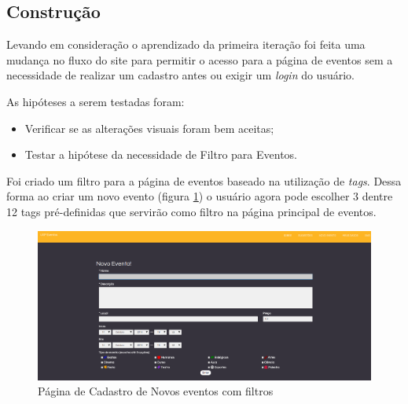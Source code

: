 \subsection{Construção}
\par Levando em consideração o aprendizado da primeira iteração foi feita uma mudança no fluxo do site para permitir o acesso para a página de eventos sem a necessidade de realizar um cadastro antes ou exigir um \emph{login} do usuário.
\par As hipóteses a serem testadas foram:
\begin{itemize}
\item Verificar se as alterações visuais foram bem aceitas;
\item Testar a hipótese da necessidade de Filtro para Eventos.
\end{itemize}
\par Foi criado um filtro para a página de eventos baseado na utilização de \emph{tags}. Dessa forma ao criar um novo evento (figura \ref{fig:event_newv2}) o usuário agora pode escolher 3 dentre 12 tags pré-definidas que servirão como filtro na página principal de eventos.
        \begin{figure}[htb]
        \centering
		\includegraphics[width=15cm]{figuras/event_newv2}
		\caption{\label{fig:event_newv2} Página de Cadastro de Novos eventos com filtros}
		\end{figure}

